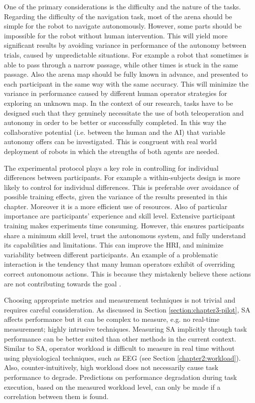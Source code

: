 \documentclass[a4paper,12pt,oneside,openright]{bhamthesis}
\begin{document}
One of the primary considerations is the difficulty and the nature of the tasks. Regarding the difficulty of the navigation task, most of the arena should be simple for the robot to navigate autonomously. However, some parts should be impossible for the robot without human intervention. This will yield more significant results by avoiding variance in performance of the autonomy between trials, caused by unpredictable situations. For example a robot that sometimes is able to pass through a narrow passage, while other times is stuck in the same passage. Also the arena map should be fully known in advance, and presented to each participant in the same way with the same accuracy. This will minimize the variance in performance caused by different human operator strategies for exploring an unknown map. In the context of our research, tasks have to be designed such that they genuinely necessitate the use of both teleoperation and autonomy in order to be better or successfully completed. In this way the collaborative potential (i.e. between the human and the AI) that variable autonomy offers can be investigated. This is congruent with real world deployment of robots in which the strengths of both agents are needed.

The experimental protocol plays a key role in controlling for individual differences between participants. For example a within-subjects design is more likely to control for individual differences. This is preferable over avoidance of possible training effects, given the variance of the results presented in this chapter. Moreover it is a more efficient use of resources. Also of particular importance are participants' experience and skill level. Extensive participant training makes experiments time consuming. However, this ensures participants share a minimum skill level, trust the autonomous system, and fully understand its capabilities and limitations. This can improve the HRI, and minimize variability between different participants. An example of a problematic interaction is the tendency that many human operators exhibit of overriding correct autonomous actions. This is because they mistakenly believe these actions are not contributing towards the goal \citep{Marble2004}.

Choosing appropriate metrics and measurement techniques is not trivial and requires careful consideration. As discussed in Section \ref{section:chapter3-pilot}, SA affects performance but it can be complex to measure, e.g. no real-time measurement; highly intrusive techniques. Measuring SA implicitly through task performance can be better suited than other methods in the current context. Similar to SA, operator workload is difficult to measure in real time without using physiological techniques, such as EEG (see Section \ref{chapter2:workload}). Also, counter-intuitively, high workload does not necessarily cause task performance to degrade. Predictions on performance degradation during task execution, based on the measured workload level, can only be made if a correlation between them is found.
\end{document}
